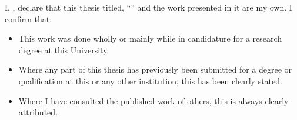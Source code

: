 \documentclass[
12pt, 
english,
onehalfspacing,
headsepline,
]{MastersDoctoralThesis}
\begin{document}

\begin{singlespacing}

\begin{declaration}
\addchaptertocentry{\authorshipname}

\noindent I, \authorname, declare that this thesis titled, \enquote{\ttitle} and the work presented in it are my own. I confirm that:

\begin{itemize} 
\item This work was done wholly or mainly while in candidature for a research degree at this University.
\item Where any part of this thesis has previously been submitted for a degree or qualification at this or any other institution, this has been clearly stated.
\item Where I have consulted the published work of others, this is always clearly attributed.
\end{itemize}

\end{declaration}

\end{singlespacing}

\end{document}
